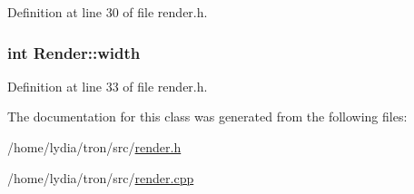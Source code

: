 Definition at line 30 of file render.\+h.

\hypertarget{class_render_a54b5039b8443453e3321997f5697a711}{
\subsubsection[{width}]{\setlength{\rightskip}{0pt plus 5cm}int Render\+::width\hspace{0.3cm}{\ttfamily [protected]}}}\label{class_render_a54b5039b8443453e3321997f5697a711}


Definition at line 33 of file render.\+h.



The documentation for this class was generated from the following files\+:\begin{DoxyCompactItemize}
\item 
/home/lydia/tron/src/\hyperlink{render_8h}{render.\+h}\item 
/home/lydia/tron/src/\hyperlink{render_8cpp}{render.\+cpp}\end{DoxyCompactItemize}
